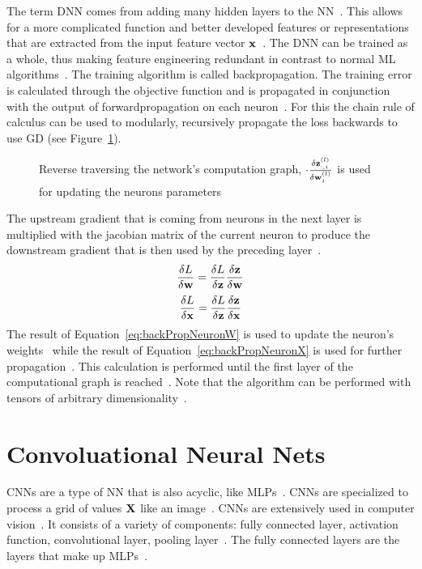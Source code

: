 The term \ac{DNN} comes from adding many hidden layers to the \ac{NN}~\citep{shrestha_review_2019}.
This allows for a more complicated function and better developed features or representations that
are extracted from the input feature vector $\textbf{x}$~\citep{oyedotun_deep_2015}.
The \ac{DNN} can be trained as a whole, thus making feature engineering redundant in contrast to
normal \ac{ML} algorithms~\citep{arpteg_software_2018}.
The training algorithm is called backpropagation.
The training error is calculated through the objective function and is propagated
in conjunction with the output of forwardpropagation on each neuron~\citep{goodfellow_deep_2016}.
For this the chain rule of calculus can be used to modularly, recursively propagate the
loss backwards to use \ac{GD} (see Figure~\ref{fig:error-backpropagation}).
\begin{figure}[ht]
	\centering
    
	\caption[Backpropagation of errors through the network.]{%
        Reverse traversing the network's computation graph,
        $\cdot \frac{\delta \textbf{z}_{:,i}^{(l)}}{\delta \textbf{w}_i^{(l)}}$ is used for
        updating the neurons parameters\label{fig:error-backpropagation}
    }
\end{figure}
The upstream gradient that is coming from neurons in the next layer is multiplied with the
jacobian matrix of the current neuron to produce the downstream gradient that is then used by
the preceding layer~\citep{boue_deep_2018,goodfellow_deep_2016}.
\begin{equation}\label{eq:backPropNeuronW}
    \frac{\delta L}{\delta\textbf{w}} = \frac{\delta L}{\delta\textbf{z}} \frac{\delta\textbf{z}}{\delta\textbf{w}}
\end{equation}
\begin{equation}\label{eq:backPropNeuronX}
    \frac{\delta L}{\delta\textbf{x}} = \frac{\delta L}{\delta\textbf{z}}\frac{\delta\textbf{z}}{\delta\textbf{x}}
\end{equation}
The result of Equation~\ref{eq:backPropNeuronW} is used to update the neuron's weights \w\ while
the result of Equation~\ref{eq:backPropNeuronX} is used for further propagation~\citep{boue_deep_2018}.
This calculation is performed until the first layer of the computational graph is
reached~\citep{goodfellow_deep_2016}.
Note that the algorithm can be performed with tensors of arbitrary
dimensionality~\citep{goodfellow_deep_2016}.

\section{Convoluational Neural Nets}
\acp{CNN} are a type of \ac{NN} that is also acyclic, like \acp{MLP}~\citep{chauhan_review_2018}.
\acp{CNN} are specialized to process a grid of values $\textbf{X}$ like an image~\citep{goodfellow_deep_2016}.
\acp{CNN} are extensively used in computer vision~\citep{chauhan_review_2018}.
It consists of a variety of components: fully connected layer, activation function,
convolutional layer, pooling layer~\citep{chauhan_review_2018,ponti_everything_2017}.
The fully connected layers are the layers that make up \acp{MLP}~\citep{ponti_everything_2017}.

